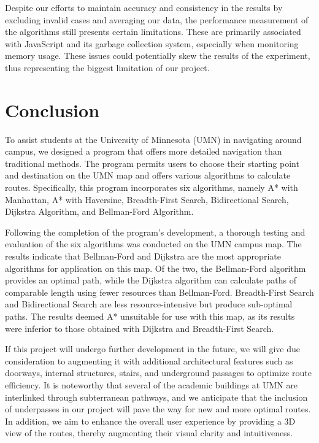 \documentclass[12pt]{article}
\begin{document}
Despite our efforts to maintain accuracy and consistency in the results by excluding invalid cases and averaging our data, the performance measurement of the algorithms still presents certain limitations. These are primarily associated with JavaScript and its garbage collection system, especially when monitoring memory usage. These issues could potentially skew the results of the experiment, thus representing the biggest limitation of our project.


\section{Conclusion}

To assist students at the University of Minnesota (UMN) in navigating around campus, we designed a program that offers more detailed navigation than traditional methods. The program permits users to choose their starting point and destination on the UMN map and offers various algorithms to calculate routes. Specifically, this program incorporates six algorithms, namely A* with Manhattan, A* with Haversine, Breadth-First Search, Bidirectional Search, Dijkstra Algorithm, and Bellman-Ford Algorithm.

Following the completion of the program's development, a thorough testing and evaluation of the six algorithms was conducted on the UMN campus map. The results indicate that Bellman-Ford and Dijkstra are the most appropriate algorithms for application on this map. Of the two, the Bellman-Ford algorithm provides an optimal path, while the Dijkstra algorithm can calculate paths of comparable length using fewer resources than Bellman-Ford. Breadth-First Search and Bidirectional Search are less resource-intensive but produce sub-optimal paths. The results deemed A* unsuitable for use with this map, as its results were inferior to those obtained with Dijkstra and Breadth-First Search.

If this project will undergo further development in the future, we will give due consideration to augmenting it with additional architectural features such as doorways, internal structures, stairs, and underground passages to optimize route efficiency. It is noteworthy that several of the academic buildings at UMN are interlinked through subterranean pathways, and we anticipate that the inclusion of underpasses in our project will pave the way for new and more optimal routes. In addition, we aim to enhance the overall user experience by providing a 3D view of the routes, thereby augmenting their visual clarity and intuitiveness.
\end{document}
